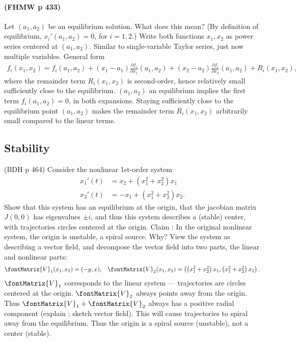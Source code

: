 \paragraph{(FHMW p 433)} Let $(a_{1},a_{2})$ be an equilibrium solution. What does this mean? (By definition of equilibrium, $x_{i}'(a_{1},a_{2}) = 0$, for $i = 1,2$.) Write both functions $x_{1},x_{2}$ as power series centered at $(a_{1},a_{2})$. Similar to single-variable Taylor series, just now multiple variables. General form
\begin{align*}
f_{i}(x_{1},x_{2})
=
f_{i}(a_{1},a_{2}) + (x_{1} - a_{1}) \frac{\partial f_{i}}{ \partial x_{1}}(a_{1},a_{2}) + (x_{2} - a_{2}) \frac{\partial f_{i}}{ \partial x_{2}}(a_{1},a_{2}) + R_{i}(x_{1},x_{2}),
\end{align*}
where the remainder term $R_{i}(x_{1},x_{2})$ is second-order, hence relatively small sufficiently close to the equilibrium. $(a_{1},a_{2})$ an equilibrium implies the first term $f_{i}(a_{1},a_{2}) = 0$, in both expansions. Staying sufficiently close to the equilibrium point $(a_{1},a_{2})$ makes the remainder term $R_{i}(x_{1},x_{2})$ arbitrarily small compared to the linear terms. 



\subsection{Stability}

(BDH p 464) Consider the nonlinear 1st-order system
\begin{align*}
x_{1}'(t)
&=
x_{2} + (x_{1}^{2} + x_{2}^{2}) x_{1}
\\
x_{2}'(t)
&=
-x_{1} + (x_{1}^{2} + x_{2}^{2}) x_{2}.
\end{align*}
Show that this system has an equilibrium at the origin, that the jacobian matrix $J(0,0)$ has eigenvalues $\pm{}i$, and thus this system describes a (stable) center, with trajectories circles centered at the origin. Claim : In the original nonlinear system, the origin is unstable, a spiral source. Why? View the system as describing a vector field, and decompose the vector field into two parts, the linear and nonlinear parts:
\begin{align*}
\fontMatrix{V}_{1}(x_{1},x_{2})
=
(-y,x),
&&
\fontMatrix{V}_{2}(x_{1},x_{2})
=
\left(\left(x_{1}^{2} + x_{2}^{2}\right) x_{1},\left(x_{1}^{2} + x_{2}^{2}\right) x_{2}\right).
\end{align*}
$\fontMatrix{V}_{1}$ corresponds to the linear system --- trajectories are circles centered at the origin. $\fontMatrix{V}_{2}$ always points away from the origin. Thus $\fontMatrix{V}_{1} + \fontMatrix{V}_{2}$ always has a positive radial component (explain ; sketch vector field). This will cause trajectories to spiral away from the equilibrium. Thus the origin is a spiral source (unstable), not a center (stable).





